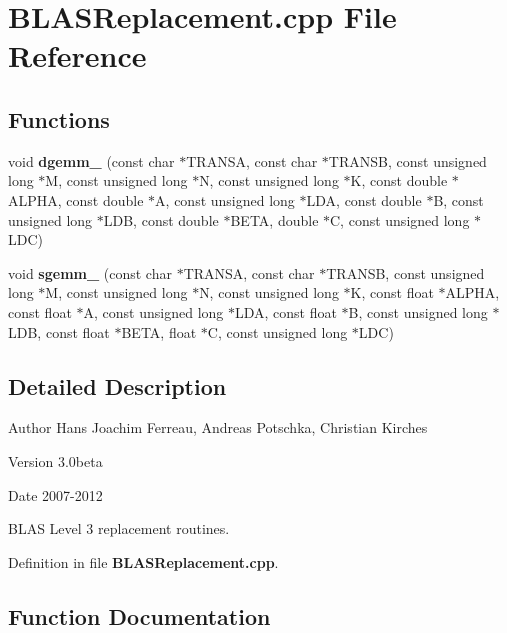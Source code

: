 \section{BLASReplacement.cpp File Reference}
\label{BLASReplacement_8cpp}
\subsection*{Functions}
\begin{DoxyCompactItemize}
\item 
void {\bf dgemm\_\-} (const char $\ast$TRANSA, const char $\ast$TRANSB, const unsigned long $\ast$M, const unsigned long $\ast$N, const unsigned long $\ast$K, const double $\ast$ALPHA, const double $\ast$A, const unsigned long $\ast$LDA, const double $\ast$B, const unsigned long $\ast$LDB, const double $\ast$BETA, double $\ast$C, const unsigned long $\ast$LDC)
\item 
void {\bf sgemm\_\-} (const char $\ast$TRANSA, const char $\ast$TRANSB, const unsigned long $\ast$M, const unsigned long $\ast$N, const unsigned long $\ast$K, const float $\ast$ALPHA, const float $\ast$A, const unsigned long $\ast$LDA, const float $\ast$B, const unsigned long $\ast$LDB, const float $\ast$BETA, float $\ast$C, const unsigned long $\ast$LDC)
\end{DoxyCompactItemize}


\subsection{Detailed Description}
\begin{DoxyAuthor}{Author}
Hans Joachim Ferreau, Andreas Potschka, Christian Kirches 
\end{DoxyAuthor}
\begin{DoxyVersion}{Version}
3.0beta 
\end{DoxyVersion}
\begin{DoxyDate}{Date}
2007-\/2012
\end{DoxyDate}
BLAS Level 3 replacement routines. 

Definition in file {\bf BLASReplacement.cpp}.



\subsection{Function Documentation}
